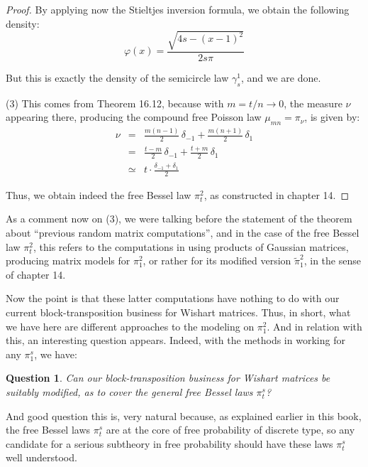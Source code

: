 \documentclass[12pt]{amsbook}
\newtheorem{question}[theorem]{Question}
\begin{document}
\begin{proof}
By applying now the Stieltjes inversion formula, we obtain the following density:
$$\varphi(x)=\frac{\sqrt{4s-(x-1)^2}}{2s\pi}$$

But this is exactly the density of the semicircle law $\gamma_s^1$, and we are done.

\medskip

(3) This comes from Theorem 16.12, because with $m=t/n\to 0$, the measure $\nu$ appearing there, producing the compound free Poisson law $\mu_{mn}=\pi_\nu$, is given by: 
\begin{eqnarray*}
\nu
&=&\frac{m(n-1)}{2}\,\delta_{-1}+\frac{m(n+1)}{2}\,\delta_1\\
&=&\frac{t-m}{2}\,\delta_{-1}+\frac{t+m}{2}\,\delta_1\\
&\simeq&t\cdot\frac{\delta_{-1}+\delta_1}{2}
\end{eqnarray*}

Thus, we obtain indeed the free Bessel law $\pi^2_t$, as constructed in chapter 14.
\end{proof}

As a comment now on (3), we were talking before the statement of the theorem about ``previous random matrix computations'', and in the case of the free Bessel law $\pi^2_t$, this refers to the computations in \cite{bb+} using products of Gaussian matrices, producing matrix models for $\pi^2_1$, or rather for its modified version $\tilde{\pi}^2_1$, in the sense of chapter 14.

\bigskip

Now the point is that these latter computations have nothing to do with our current block-transposition business for Wishart matrices. Thus, in short, what we have here are different approaches to the modeling on $\pi^2_1$. And in relation with this, an interesting question appears. Indeed, with the methods in \cite{bb+} working for any $\pi^s_1$, we have:

\begin{question}
Can our block-transposition business for Wishart matrices be suitably modified, as to cover the general free Bessel laws $\pi^s_t$?
\end{question}

And good question this is, very natural because, as explained earlier in this book, the free Bessel laws $\pi^s_t$ are at the core of free probability of discrete type, so any candidate for a serious subtheory in free probability should have these laws $\pi^s_t$ well understood.

\bigskip
\end{document}
